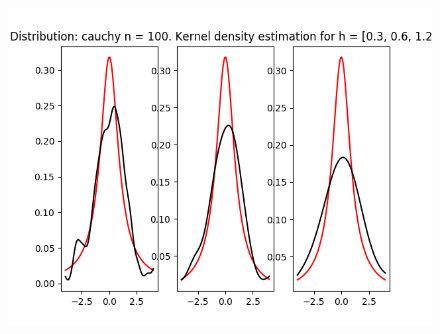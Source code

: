 \documentclass[12pt]{report}
\begin{document}
\begin{center}
\begin{figure}[H]
\includegraphics[width=\textwidth]{../lab_4/pic/kernel/d_cauchy100.png}
\end{figure}


\end{center}
\end{document}
